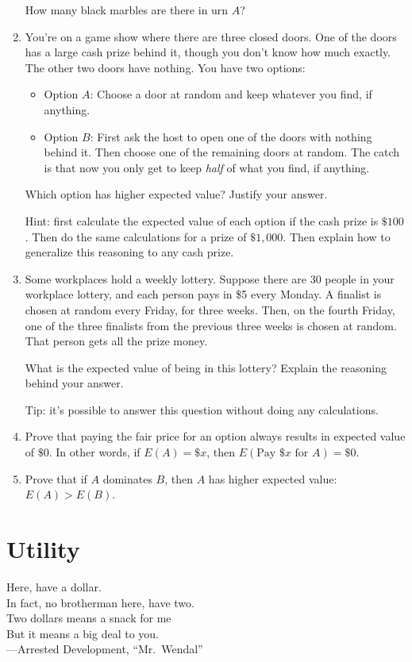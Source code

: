 \documentclass[justified]{tufte-book}
\providecommand{\tightlist}{%
  \setlength{\itemsep}{0pt}\setlength{\parskip}{0pt}}
\newenvironment{epigraph}%
{
\begin{flushright}    
\begin{minipage}{20em}
\begin{flushright}
\itshape
}%
{
\end{flushright}
\end{minipage}
\end{flushright}
}
\theoremstyle{definition}
\theoremstyle{definition}
\theoremstyle{definition}
\theoremstyle{remark}
\begin{document}
\begin{enumerate}
  How many black marbles are there in urn \(A\)?
\item
  You're on a game show where there are three closed doors. One of the doors has a large cash prize behind it, though you don't know how much exactly. The other two doors have nothing. You have two options:

  \begin{itemize}
  \tightlist
  \item
    Option \(A\): Choose a door at random and keep whatever you find, if anything.
  \item
    Option \(B\): First ask the host to open one of the doors with nothing behind it. Then choose one of the remaining doors at random. The catch is that now you only get to keep \emph{half} of what you find, if anything.
  \end{itemize}

  Which option has higher expected value? Justify your answer.

  Hint: first calculate the expected value of each option if the cash prize is \(\$100\). Then do the same calculations for a prize of \(\$1,000\). Then explain how to generalize this reasoning to any cash prize.
\item
  Some workplaces hold a weekly lottery. Suppose there are 30 people in your workplace lottery, and each person pays in \$5 every Monday. A finalist is chosen at random every Friday, for three weeks. Then, on the fourth Friday, one of the three finalists from the previous three weeks is chosen at random. That person gets all the prize money.

  What is the expected value of being in this lottery? Explain the reasoning behind your answer.

  Tip: it's possible to answer this question without doing any calculations.
\item
  Prove that paying the fair price for an option always results in expected value of \(\$0\). In other words, if \(E(A) = \$x\), then \(E(\mbox{Pay } \$x \mbox{ for } A) = \$0\).
\item
  Prove that if \(A\) dominates \(B\), then \(A\) has higher expected value: \(E(A) > E(B)\).
\end{enumerate}

\hypertarget{utility}{%
\chapter{Utility}\label{utility}}

\begin{epigraph}
Here, have a dollar.\\
In fact, no brotherman here, have two.\\
Two dollars means a snack for me\\
But it means a big deal to you.\\
---Arrested Development, ``Mr.~Wendal''
\end{epigraph}
\end{document}

